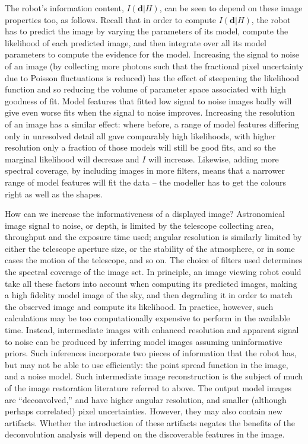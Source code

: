 \documentclass[letterpaper, 11pt]{article}
\begin{document}
The robot's information content, $I(\boldsymbol{d}|H)$, can be seen to depend
on these image properties too, as follows. Recall that in order to compute 
$I(\boldsymbol{d}|H)$, the robot has to predict the image by varying the
parameters of its model, compute the likelihood of each predicted image, and
then integrate over all its model parameters to compute the evidence for the
model. Increasing the signal to noise of an image (by collecting more photons
such that the fractional pixel uncertainty due to Poisson fluctuations is
reduced) has the effect of steepening the likelihood function and so reducing
the volume of parameter space associated with high goodness of fit. Model
features that fitted low signal to noise images badly will give even worse
fits when the signal to noise improves. Increasing the resolution of an image
has a similar effect: where before, a range of model features  differing only
in unresolved detail all gave comparably high likelihoods, with higher
resolution only a fraction of those models will still be good fits, and so the
marginal likelihood will decrease and $I$ will increase. Likewise, adding more
spectral coverage, by including images in more filters, means that a narrower
range of model features will fit the data -- the modeller has to get the
colours right as well as the shapes.  

How can we increase the informativeness of a displayed image? Astronomical
image signal to noise, or depth, is limited by the telescope collecting area,
throughput and the exposure time used; angular resolution is similarly limited
by either the telescope aperture size, or the stability of the atmosphere, or
in some cases the motion of the telescope, and so on. The choice of filters
used determines the spectral coverage of the image set. In principle, an image
viewing robot could take all these factors into account when computing its
predicted images, making a high fidelity model image of the sky, and then
degrading it in order to match the observed image and  compute its likelihood.
In practice, however, such calculations may be too computationally expensive
to perform in the available time. Instead, intermediate images with enhanced
resolution and apparent signal to noise can be produced by inferring model
images assuming uninformative priors. Such inferences incorporate two pieces
of information that the robot has, but may not be able to use efficiently: the
point spread function in the image, and a noise model. Such intermediate image
reconstruction is the subject of much of the image restoration literature
referred to above. The output model images are ``deconvolved,'' and have
higher angular resolution, and smaller (although perhaps correlated) pixel
uncertainties. However, they may also contain new artifacts. Whether the
introduction of these artifacts negates the benefits of the deconvolution
analysis will depend on the discoverable  features in the image. 
\end{document}
